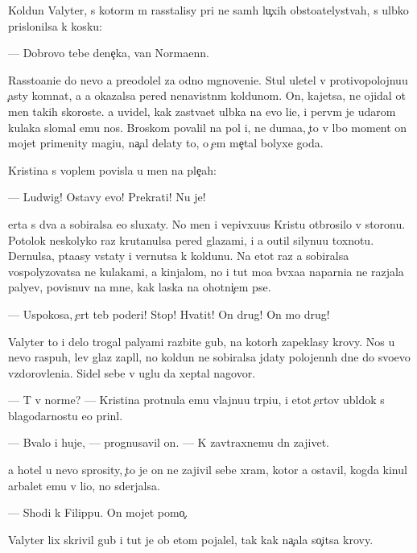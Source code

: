 \documentclass[10pt]{book}
\begin{document}
Koldun Valyter, s kotor{\yi}m m{\yi} rasstalisy pri ne sam{\yi}h lu{\c}xih obsto{\y}atelystvah, s ul{\yi}bko{\y} prislonilsa k kos{\ia}ku:

— Dobrovo tebe dene{\c}ka, van Norma{\y}enn.

Rassto{\y}ani{\y}e do nevo {\y}a preodolel za odno mgnoveni{\y}e. Stul uletel v protivopolojnu{\y}u {\c}asty komnat{\yi}, a {\y}a okazalsa pered nenavistn{\yi}m koldunom. On, kajetsa, ne ojidal ot men{\ia} takih skoroste{\y}. {\Y}a uvidel, kak zast{\yi}va{\y}et ul{\yi}bka na {\y}evo li{\q}e, i perv{\yi}m je udarom kulaka slomal {\y}emu nos. Broskom povalil na pol i, ne duma{\y}a, {\c}to v l{\iu}bo{\y} moment on mojet primenity magi{\y}u, na{\c}al delaty to, o {\c}em me{\c}tal bolyxe goda.

Kristina s voplem povisla u men{\ia} na ple{\c}ah:

— Ludwig! Ostavy {\y}evo! Prekrati! Nu je!

{\C}erta s dva {\y}a sobiralsa {\y}e{\y}o sluxaty. No men{\ia} i v{\q}epivxu{\y}us{\ia} Kristu otbrosilo v storonu. Potolok neskolyko raz krutanulsa pered glazami, i {\y}a o{\x}util silynu{\y}u toxnotu. Dernulsa, p{\yi}ta{\y}asy vstaty i vernutsa k koldunu. Na etot raz {\y}a sobiralsa vospolyzovatsa ne kulakami, a kinjalom, no i tut mo{\y}a b{\yi}vxa{\y}a naparni{\q}a ne razjala paly{\q}ev, povisnuv na mne, kak laska na ohotni{\c}{\y}em pse.

— Uspoko{\y}sa, {\c}ert teb{\ia} poderi! Stop! Hvatit! On drug! On mo{\y} drug!



Valyter to i delo trogal paly{\q}ami razbit{\yi}{\y}e gub{\yi}, na kotor{\yi}h zapeklasy krovy. Nos u nevo raspuh, lev{\yi}{\y} glaz zapl{\yi}l, no koldun ne sobiralsa jdaty polojenn{\yi}h dne{\y} do svo{\y}evo v{\yi}zdorovleni{\y}a. Sidel sebe v uglu da xeptal nagovor{\yi}.

— T{\yi} v norme? — Kristina prot{\ia}nula {\y}emu vlajnu{\y}u tr{\ia}pi{\q}u, i etot {\c}ertov ubl{\iu}dok s blagodarnost{\y}u {\y}e{\y}o prin{\ia}l.

— B{\yi}valo i huje, — prognusavil on. — K zavtraxnemu dn{\iu} zajivet.

{\Y}a hotel u nevo sprosity, {\c}to je on ne zajivil sebe xram, kotor{\yi}{\y} {\y}a ostavil, kogda kinul arbalet {\y}emu v li{\q}o, no sderjalsa.

— Shodi k Filippu. On mojet pomo{\c}.

Valyter lix skrivil gub{\yi} i tut je ob etom pojalel, tak kak na{\c}ala so{\c}itsa krovy.
\end{document}

